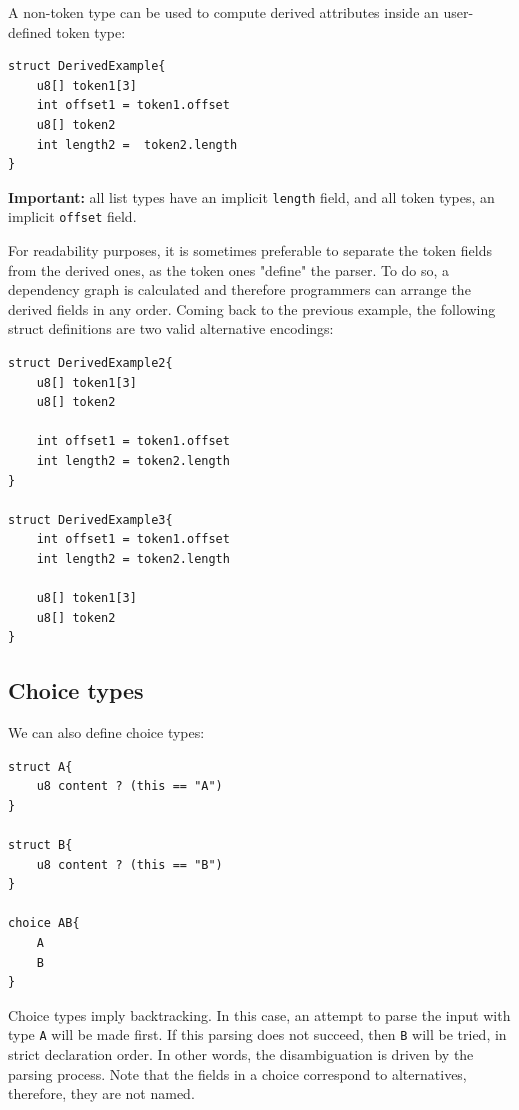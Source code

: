 \documentclass[10pt,oneside]{article}
\begin{document}
A non-token type can be used to compute derived attributes inside an
user-defined token type:

\begin{verbatim}
struct DerivedExample{
    u8[] token1[3]
    int offset1 = token1.offset
    u8[] token2
    int length2 =  token2.length
}
\end{verbatim}

\textbf{Important:} all list types have an implicit \texttt{length}
field, and all token types, an implicit \texttt{offset} field.

For readability purposes, it is sometimes preferable to separate the
token fields from the derived ones, as the token ones "define" the
parser. To do so, a dependency graph is calculated and therefore
programmers can arrange the derived fields in any order. Coming back to
the previous example, the following struct definitions are two valid
alternative encodings:

\begin{verbatim}
struct DerivedExample2{
    u8[] token1[3]
    u8[] token2
    
    int offset1 = token1.offset
    int length2 = token2.length
}

struct DerivedExample3{
    int offset1 = token1.offset
    int length2 = token2.length
        
    u8[] token1[3]
    u8[] token2
}
\end{verbatim}

\hypertarget{choice-types}{%
\subsection{Choice types}\label{choice-types}}

We can also define choice types:

\begin{verbatim}
struct A{
    u8 content ? (this == "A")
}

struct B{
    u8 content ? (this == "B")
}

choice AB{
    A
    B
}
\end{verbatim}

Choice types imply backtracking. In this case, an attempt to parse the
input with type \texttt{A} will be made first. If this parsing does not
succeed, then \texttt{B} will be tried, in strict declaration order. In
other words, the disambiguation is driven by the parsing process. Note
that the fields in a choice correspond to alternatives, therefore, they
are not named.
\end{document}
